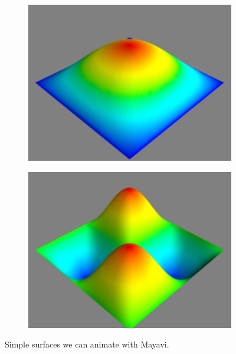 \begin{figure}
\begin{subfigure}{.49\textwidth}
\includegraphics[width=\textwidth]{harmonic1.pdf}
\end{subfigure}
\begin{subfigure}{.49\textwidth}
\includegraphics[width=\textwidth]{harmonic2.pdf}
\end{subfigure}
\caption{Simple surfaces we can animate with Mayavi.}
\label{fig:harmonic_animations}
\end{figure}

